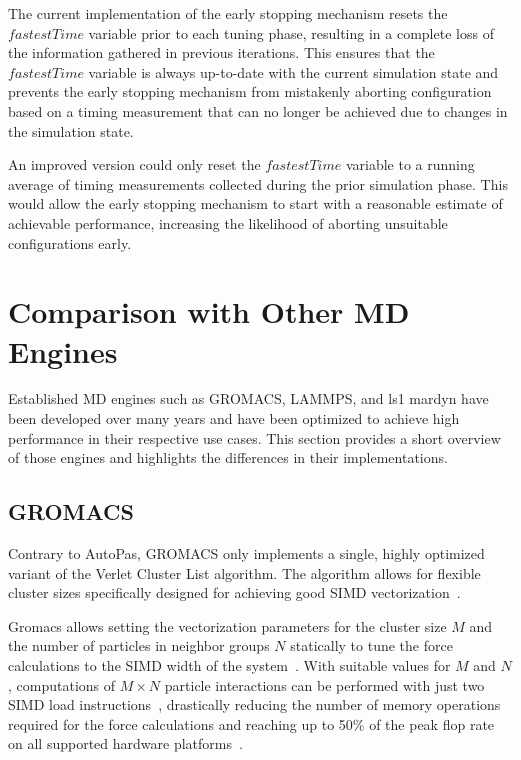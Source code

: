 \documentclass[conference]{IEEEtran}
\begin{document}
\begin{description}[leftmargin=1.2em, font=\itshape]
    \item[Limitations and Future Work:]
        The current implementation of the early stopping mechanism resets the $fastestTime$ variable prior to each tuning phase, resulting in a complete loss of the information gathered in previous iterations. This ensures that the $fastestTime$ variable is always up-to-date with the current simulation state and prevents the early stopping mechanism from mistakenly aborting configuration based on a timing measurement that can no longer be achieved due to changes in the simulation state.

        An improved version could only reset the $fastestTime$ variable to a running average of timing measurements collected during the prior simulation phase. This would allow the early stopping mechanism to start with a reasonable estimate of achievable performance, increasing the likelihood of aborting unsuitable configurations early.

\end{description}

\section{Comparison with Other MD Engines}

Established MD engines such as GROMACS, LAMMPS, and ls1 mardyn have been developed over many years and have been optimized to achieve high performance in their respective use cases. This section provides a short overview of those engines and highlights the differences in their implementations.

\subsection{GROMACS}

Contrary to AutoPas, GROMACS only implements a single, highly optimized variant of the Verlet Cluster List algorithm. The algorithm allows for flexible cluster sizes specifically designed for achieving good SIMD vectorization~\cite{PALL20132641}.

Gromacs allows setting the vectorization parameters for the cluster size $M$ and the number of particles in neighbor groups $N$ statically to tune the force calculations to the SIMD width of the system~\cite{PALL20132641}. With suitable values for $M$ and $N$, computations of $M \times N$ particle interactions can be performed with just two SIMD load instructions~\cite{Solving_Software_Challenges_Exascale_2014}, drastically reducing the number of memory operations required for the force calculations and reaching up to 50\% of the peak flop rate on all supported hardware platforms~\cite{Solving_Software_Challenges_Exascale_2014}.
\end{document}
